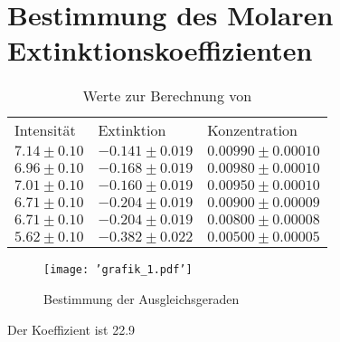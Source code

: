 \documentclass{article}
\begin{document}
\section*{Bestimmung des Molaren Extinktionskoeffizienten}


            \begin{table}
                \caption{Werte zur Berechnung von \epsilon}
                \centering
                \begin{tabular}{l|l|l}
            		Intensität & Extinktion & Konzentration \\
			$7.14 \pm 0.10$ & $-0.141 \pm 0.019$ & $0.00990 \pm 0.00010$ \\
			$6.96 \pm 0.10$ & $-0.168 \pm 0.019$ & $0.00980 \pm 0.00010$ \\
			$7.01 \pm 0.10$ & $-0.160 \pm 0.019$ & $0.00950 \pm 0.00010$ \\
			$6.71 \pm 0.10$ & $-0.204 \pm 0.019$ & $0.00900 \pm 0.00009$ \\
			$6.71 \pm 0.10$ & $-0.204 \pm 0.019$ & $0.00800 \pm 0.00008$ \\
			$5.62 \pm 0.10$ & $-0.382 \pm 0.022$ & $0.00500 \pm 0.00005$ \\

                \end{tabular}
            \end{table}
          

\begin{figure}
  \texttt{[image: 'grafik\_1.pdf']}
  \caption{Bestimmung der Ausgleichsgeraden}
\end{figure}

Der Koeffizient ist 22.9 
\end{document}
